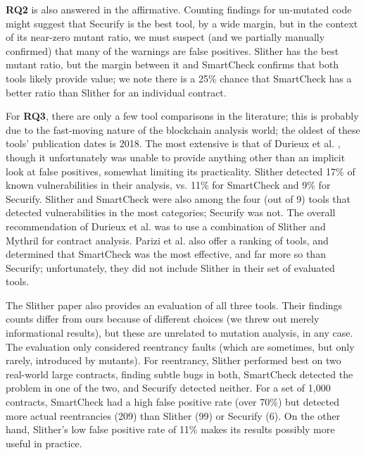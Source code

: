 {\bf RQ2} is also answered in the affirmative.  Counting findings for un-mutated code might suggest that Securify is the best tool, by a wide margin, but in the context of its near-zero mutant ratio, we must suspect (and we partially manually confirmed) that many of the warnings are false positives.  Slither has the best mutant ratio, but the margin between it and SmartCheck confirms that both tools likely provide value; we note there is a 25\% chance that SmartCheck has a better ratio than Slither for an individual contract.

For {\bf RQ3}, there are only a few tool comparisons in the literature; this is probably due to the fast-moving nature of the blockchain analysis world; the oldest of these tools' publication dates is 2018.  The most extensive is that of Durieux et al. \cite{durieux2019empirical}, though it unfortunately was unable to provide anything other than an implicit look at false positives, somewhat limiting its practicality.  Slither detected 17\% of known vulnerabilities in their analysis, vs. 11\% for SmartCheck and 9\% for Securify. Slither and SmartCheck were also among the four (out of 9) tools that detected vulnerabilities in the most categories; Securify was not.  The overall recommendation of Durieux et al. was to use a combination of Slither and Mythril \cite{mythril-code} for contract analysis.  Parizi et al. \cite{Parizi} also offer a ranking of tools, and determined that SmartCheck was the most effective, and far more so than Securify; unfortunately, they did not include Slither in their set of evaluated tools.

The Slither paper \cite{slither} also provides an evaluation of all three tools.  Their findings counts differ from ours because of different choices (we threw out merely informational results), but these are unrelated to mutation analysis, in any case.  The evaluation only considered reentrancy faults \cite{SurveyAttacks,FC20} (which are sometimes, but only rarely, introduced by mutants).  For reentrancy, Slither performed best on two real-world large contracts, finding subtle bugs in both, SmartCheck detected the problem in one of the two, and Securify detected neither.  For a set of 1,000 contracts, SmartCheck had a high false positive rate (over 70\%) but detected more actual reentrancies (209) than Slither (99) or Securify (6).  On the other hand, Slither's low false positive rate of 11\%  makes its results possibly more useful in practice.

